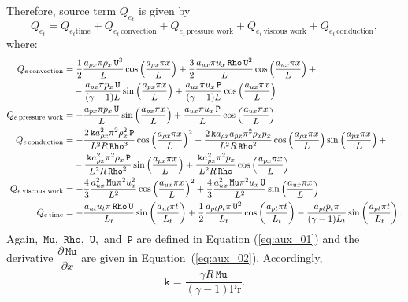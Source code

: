 \documentclass[10pt]{article}
\newcommand{\diff}[2] {\dfrac{\partial #1}{\partial #2}}
\newcommand{\Rho}{\,\mathtt{Rho}}
\newcommand{\PP}{\,\mathtt{P}}
\newcommand{\U}{\,\mathtt{U}}
\newcommand{\Mu}{\,\mathtt{Mu}}
\newcommand{\DMuDx}{\diff{\Mu}{x}}
\newcommand{\kk}{\,\mathtt{k}}
\newcommand{\timee}{\,\text{time}}
\newcommand{\convection}{\,\text{convection}}
\newcommand{\conduction}{\,\text{conduction}}
\newcommand{\workpressure}{\,\text{pressure work}}
\newcommand{\workviscous}{\,\text{viscous work}}
\begin{document}
Therefore, source term $Q_{e_t}$ is given by
$$Q_{e_t} = Q_{e_t \text{time}} + Q_{e_t \convection} + Q_{e_t \workpressure}+ Q_{e_t \workviscous} + Q_{e_t \conduction}, $$
where:
\begin{equation*}
\begin{split}
 Q_{e \convection} &= \dfrac{1}{2} \dfrac{a_{\rho x} \pi \rho_x \U^3 }{L}\cos\left(\dfrac{a_{\rho x} \pi x}{L}\right) + \dfrac{3}{2} \dfrac{a_{ux} \pi u_x \Rho \U^2 }{L}\cos\left(\dfrac{a_{ux} \pi x}{L}\right) +\\
  &\quad-\dfrac{a_{px} \pi p_x \U  }{(\gamma-1) L}\sin\left(\dfrac{a_{px} \pi x}{L}\right)+\dfrac{a_{ux} \pi u_x \PP }{(\gamma-1) L} \cos\left(\dfrac{a_{ux} \pi x}{L}\right) \\ \vspace*{15pt}
Q_{e \workpressure} &= -\dfrac{a_{px} \pi p_x \U }{L}\sin\left(\dfrac{a_{px} \pi x}{L}\right) +\dfrac{a_{ux} \pi u_x \PP}{L} \cos\left(\dfrac{a_{ux} \pi x}{L}\right) \vspace{10pt}\\ 
%
Q_{e \conduction} &= - \dfrac{2 \kk a_{\rho x}^2 \pi^2 \rho_x^2 \PP}{L^2 R \Rho^3}\cos\left(\dfrac{a_{\rho x} \pi x}{L}\right)^2 -\dfrac{2 \kk a_{\rho x} a_{px} \pi^2 \rho_x p_x }{L^2 R \Rho^2}\cos\left(\dfrac{a_{\rho x} \pi x}{L}\right) \sin\left(\dfrac{a_{px} \pi x}{L}\right) +\\
  &\quad-\dfrac{\kk a_{\rho x}^2 \pi^2 \rho_x \PP }{L^2 R \Rho^2}\sin\left(\dfrac{a_{\rho x} \pi x}{L}\right) 
        +\dfrac{\kk a_{px}^2 \pi^2 p_x}{L^2 R \Rho} \cos\left(\dfrac{a_{px} \pi x}{L}\right) \\ \vspace{15pt} 
%
Q_{e \workviscous} &= -\dfrac{4}{3} \dfrac{a_{ux}^2 \Mu \pi^2 u_x^2}{L^2} \cos\left(\dfrac{a_{ux} \pi x}{L}\right)^2+\dfrac{4}{3} \dfrac{a_{ux}^2 \Mu \pi^2 u_x \U }{L^2}\sin\left(\dfrac{a_{ux} \pi x}{L}\right)\\ \vspace{15pt} 
%
Q_{e \timee} &= -\dfrac{a_{ut} u_t \pi \Rho \U }{L_t}\sin\left(\dfrac{a_{ut} \pi t}{L_t}\right)  +\dfrac{1}{2} \dfrac{a_{\rho t} \rho_t \pi \U^2  }{L_t}\cos\left(\dfrac{a_{\rho t} \pi t}{L_t}\right) -\dfrac{a_{pt} p_t \pi}{(\gamma-1) L_t} \sin\left(\dfrac{a_{pt} \pi t}{L_t}\right).
\end{split}
\end{equation*}
Again, $\Mu,\, \Rho,\,\U,$ and $\PP$ are defined in Equation (\ref{eq:aux_01}) and the derivative $\DMuDx$  are given in Equation~(\ref{eq:aux_02}).
Accordingly,
$$\texttt{k}=\dfrac{\gamma R \Mu}{(\gamma-1)\text{Pr}}.$$
\end{document}
